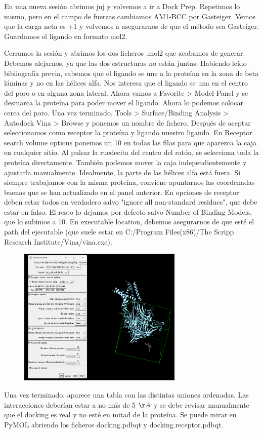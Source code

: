 En una nueva sesión abrimos jnj y volvemos a ir a Dock Prep. Repetimos lo mismo, pero en el campo de fuerzas cambiamos AM1-BCC por Gasteiger. Vemos que la carga neta es +1 y volvemos a asegurarnos de que el método sea Gasteiger. Guardamos el ligando en formato mol2. 

Cerramos la sesión y abrimos los dos ficheros .mol2 que acabamos de generar. Debemos alejarnos, ya que las dos estructuras no están juntas. Habiendo leído bibliografía previa, sabemos que el ligando se une a la proteína en la zona de beta láminas y no en las hélices alfa. Nos interesa que el ligando se una en el centro del poro o en alguna zona lateral. Ahora vamos a Favorite > Model Panel y se desmarca la proteína para poder mover el ligando. Ahora lo podemos colocar cerca del poro. Una vez terminado, Tools > Surface/Binding Analysis > Autodock Vina > Browse y ponemos un nombre de fichero. Después de aceptar seleccionamos como receptor la proteína y ligando nuestro ligando. En Receptor search volume options ponemos un 10 en todas las filas para que aparezca la caja en cualquier sitio. Al pulsar la ruedecita del centro del ratón, se selecciona toda la proteína directamente. También podemos mover la caja independientemente y ajustarla manualmente. Idealmente, la parte de las hélices alfa está fuera. Si siempre trabajamos con la misma proteína, conviene apuntarnos las coordenadas buenas que se han actualizado en el panel anterior. En opciones de receptor deben estar todos en verdadero salvo "ignore all non-standard residues", que debe estar en falso. El resto lo dejamos por defecto salvo Number of Binding Models, que lo subimos a 10. En executable location, debemos asegurarnos de que esté el path del ejecutable (que suele estar en C:/Program Files(x86)/The Scripp Research Institute/Vina/vina.exe).

\begin{figure}[h]
\centering
\includegraphics[width = 0.7\textwidth]{figs/docking.png}
\end{figure}

Una vez terminado, aparece una tabla con las distintas uniones ordenadas. Las interacciones deberían estar a no más de 5 $\AA$ y se debe revisar manualmente que el docking es real y no esté en mitad de la proteína. Se puede mirar en PyMOL abriendo los ficheros docking.pdbqt y docking.receptor.pdbqt. 